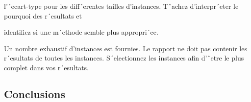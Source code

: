 \documentclass{article}[12pt]
\begin{document}
   l’´ecart-type pour les diff´erentes tailles
d’instances.
   Tˆachez d’interpr´eter le pourquoi des r´esultats et

   identifiez si une m´ethode semble plus
appropri´ee.

Un nombre exhaustif d’instances est fournies. Le rapport ne doit pas contenir les r´esultats de toutes
les instances. S´electionnez les instances afin d’ˆetre le plus complet dans vos r´esultats.






    \newpage

    \subsection{Conclusions }



    \newpage
    
    
\begin{thebibliography}{99}





    


\end{thebibliography}


    

    
\end{document}
